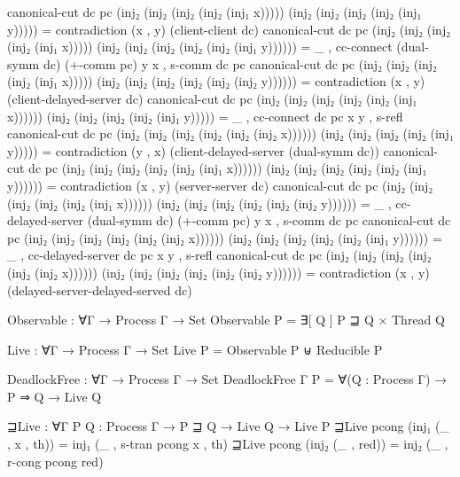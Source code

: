 \begin{code}
canonical-cut dc pc (inj₂ (inj₂ (inj₂ (inj₂ (inj₁ x))))) (inj₂ (inj₂ (inj₂ (inj₂ (inj₁ y))))) = contradiction (x , y) (client-client dc)
canonical-cut dc pc (inj₂ (inj₂ (inj₂ (inj₂ (inj₁ x))))) (inj₂ (inj₂ (inj₂ (inj₂ (inj₂ (inj₁ y)))))) = _ , cc-connect (dual-symm dc) (+-comm pc) y x , s-comm dc pc
canonical-cut dc pc (inj₂ (inj₂ (inj₂ (inj₂ (inj₁ x))))) (inj₂ (inj₂ (inj₂ (inj₂ (inj₂ (inj₂ y)))))) = contradiction (x , y) (client-delayed-server dc)
canonical-cut dc pc (inj₂ (inj₂ (inj₂ (inj₂ (inj₂ (inj₁ x)))))) (inj₂ (inj₂ (inj₂ (inj₂ (inj₁ y))))) = _ , cc-connect dc pc x y , s-refl
canonical-cut dc pc (inj₂ (inj₂ (inj₂ (inj₂ (inj₂ (inj₂ x)))))) (inj₂ (inj₂ (inj₂ (inj₂ (inj₁ y))))) = contradiction (y , x) (client-delayed-server (dual-symm dc))
canonical-cut dc pc (inj₂ (inj₂ (inj₂ (inj₂ (inj₂ (inj₁ x)))))) (inj₂ (inj₂ (inj₂ (inj₂ (inj₂ (inj₁ y)))))) = contradiction (x , y) (server-server dc)
canonical-cut dc pc (inj₂ (inj₂ (inj₂ (inj₂ (inj₂ (inj₁ x)))))) (inj₂ (inj₂ (inj₂ (inj₂ (inj₂ (inj₂ y)))))) = _ , cc-delayed-server (dual-symm dc) (+-comm pc) y x , s-comm dc pc
canonical-cut dc pc (inj₂ (inj₂ (inj₂ (inj₂ (inj₂ (inj₂ x)))))) (inj₂ (inj₂ (inj₂ (inj₂ (inj₂ (inj₁ y)))))) = _ , cc-delayed-server dc pc x y , s-refl
canonical-cut dc pc (inj₂ (inj₂ (inj₂ (inj₂ (inj₂ (inj₂ x)))))) (inj₂ (inj₂ (inj₂ (inj₂ (inj₂ (inj₂ y)))))) = contradiction (x , y) (delayed-server-delayed-served dc)

Observable : ∀{Γ} → Process Γ → Set
Observable P = ∃[ Q ] P ⊒ Q × Thread Q

Live : ∀{Γ} → Process Γ → Set
Live P = Observable P ⊎ Reducible P

DeadlockFree : ∀{Γ} → Process Γ → Set
DeadlockFree {Γ} P = ∀(Q : Process Γ) → P ⇒ Q → Live Q

⊒Live : ∀{Γ} {P Q : Process Γ} → P ⊒ Q → Live Q → Live P
⊒Live pcong (inj₁ (_ , x , th)) = inj₁ (_ , s-tran pcong x , th)
⊒Live pcong (inj₂ (_ , red)) = inj₂ (_ , r-cong pcong red)


\end{code}
